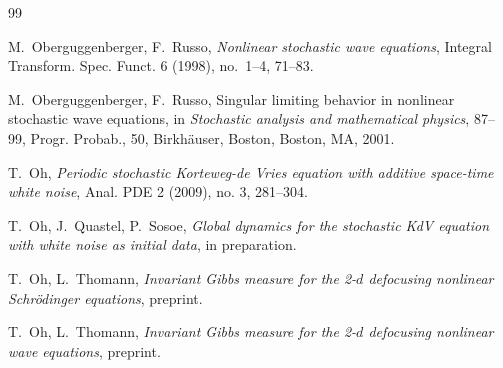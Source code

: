 \documentclass[letterpaper, 11pt,  reqno]{amsart}
\newcommand{\1}{\hspace{0.5mm}\text{I}\hspace{0.5mm}}
\numberwithin{equation}{section}
\numberwithin{theorem}{section}
\begin{document}
\begin{thebibliography}{99}
%


M.~Oberguggenberger, F.~Russo, 
{\it Nonlinear stochastic wave equations}, Integral Transform. Spec. Funct.  6 (1998), no.~1--4, 71--83. %


M.~Oberguggenberger, F.~Russo, Singular limiting behavior in nonlinear stochastic wave equations, in {\it Stochastic analysis and mathematical physics}, 87--99, Progr. Probab., 50, Birkh\"auser, Boston, 
 Boston, MA, 2001.




T.~Oh, {\it Periodic stochastic Korteweg-de Vries equation with additive space-time white noise}, Anal. PDE 2 (2009), no. 3, 281--304. 



%
%
T.~Oh, J.~Quastel, P.~Sosoe, 
{\it Global dynamics for the stochastic KdV
equation with white noise as initial data}, in preparation.


%
   
T.~Oh, L.~Thomann, 
{\it Invariant Gibbs measure for 
the 2-$d$ defocusing nonlinear Schr\"odinger equations}, 
preprint.


T.~Oh, L.~Thomann, 
{\it Invariant Gibbs measure for 
the 2-$d$ defocusing nonlinear wave  equations}, 
preprint.








\end{thebibliography}
\end{document}
